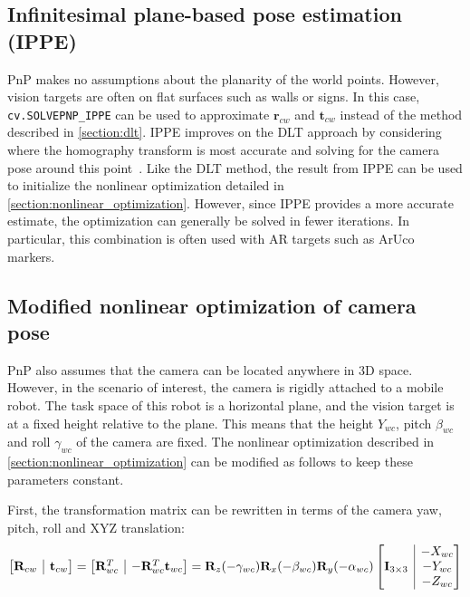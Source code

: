 \documentclass{article}
\makeatletter
\newcommand{\onebytwo}[2]{\ensuremath{\left[\begin{array}{@{}c|c@{}} #1 & #2 \end{array}\right]}}
\makeatother
\begin{document}
\subsection{Infinitesimal plane-based pose estimation (IPPE)}
PnP makes no assumptions about the planarity of the world points. However, vision targets  are often on flat surfaces such as walls or signs. In this case, \verb|cv.SOLVEPNP_IPPE| can be used to approximate $\mathbf{r}_{cw}$ and $\mathbf{t}_{cw}$ instead of the method described in \ref{section:dlt}. IPPE improves on the DLT approach by considering where the homography transform is most accurate and solving for the camera pose around this point~\cite{ippe}. Like the DLT method, the result from IPPE can be used to initialize the nonlinear optimization detailed in \ref{section:nonlinear_optimization}. However, since IPPE provides a more accurate estimate, the optimization can generally be solved in fewer iterations. In particular, this combination is often used with AR targets such as ArUco markers.

\subsection{Modified nonlinear optimization of camera pose}
PnP also assumes that the camera can be located anywhere in 3D space. However, in the scenario of interest, the camera is rigidly attached to a mobile robot. The task space of this robot is a horizontal plane, and the vision target is at a fixed height relative to the plane. This means that the height $Y_{wc}$, pitch $\beta_{wc}$ and roll $\gamma_{wc}$ of the camera are fixed. The nonlinear optimization described in \ref{section:nonlinear_optimization} can be modified as follows to keep these parameters constant.

First, the transformation matrix can be rewritten in terms of the camera yaw, pitch, roll and XYZ translation:
\begin{align*}
    \onebytwo{\mathbf{R}_{cw}}{\mathbf{t}_{cw}} = \onebytwo{\mathbf{R}_{wc}^T}{-\mathbf{R}_{wc}^T\mathbf{t}_{wc}} = \mathbf{R}_z(-\gamma_{wc}) \mathbf{R}_x(-\beta_{wc}) \mathbf{R}_y(-\alpha_{wc}) \onebytwo{\mathbf{I}_{3 \times 3}}{\begin{matrix}-X_{wc} \\ -Y_{wc} \\ -Z_{wc}\end{matrix}} 
\end{align*}
\end{document}
